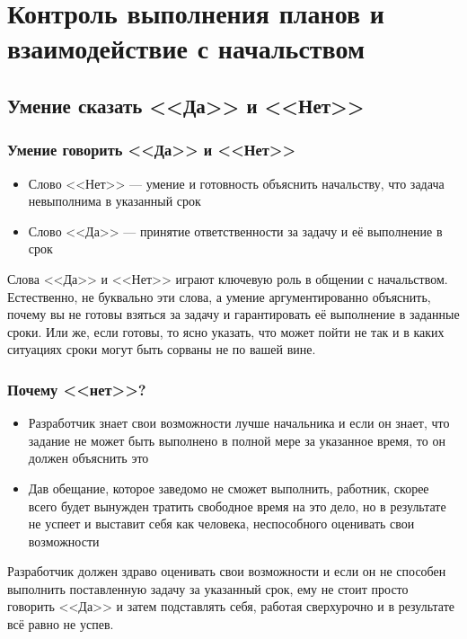 \documentclass{../industrial-development}
\begin{document}
\section{Контроль выполнения планов и взаимодействие с начальством}
\subsection{Умение сказать <<Да>> и <<Нет>>}
\begin{frame} \frametitle{Умение говорить <<Да>> и <<Нет>>}
  \begin{itemize}
	\item Слово <<Нет>> --- умение и готовность объяснить начальству, что задача невыполнима в указанный срок
	\item Слово <<Да>> --- принятие ответственности за задачу и её выполнение в срок
  \end{itemize}
\end{frame}
\lecturenotes
Слова <<Да>> и <<Нет>> играют ключевую роль в общении с начальством. Естественно, не буквально эти слова, а умение аргументированно объяснить, почему вы не готовы взяться за задачу и гарантировать её выполнение в заданные сроки. Или же, если готовы, то ясно указать, что может пойти не так и в каких ситуациях сроки могут быть сорваны не по вашей вине.

\begin{frame} \frametitle{Почему <<нет>>?}
  \begin{itemize}
  \item Разработчик знает свои возможности лучше начальника и если он знает, что задание не может быть выполнено в полной мере за указанное время, то он должен объяснить это
	\item Дав обещание, которое заведомо не сможет выполнить, работник, скорее всего будет вынужден тратить свободное время на это дело, но в результате не успеет и выставит себя как человека, неспособного оценивать свои возможности
  \end{itemize}
\end{frame}
\lecturenotes
Разработчик должен здраво оценивать свои возможности и если он не способен выполнить поставленную задачу за указанный срок, ему не стоит просто говорить <<Да>> и затем подставлять себя, работая сверхурочно и в результате всё равно не успев.
\end{document}
